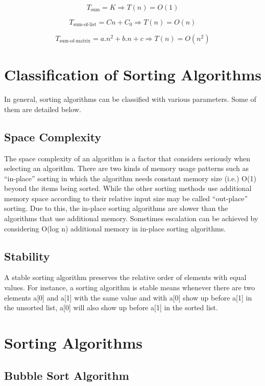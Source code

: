 \documentclass{article}
\begin{document}
\[
T_{\text{{sum}}} = K \Rightarrow T(n) = O(1)
\]

\[
T_{\text{{sum-of-list}}} = Cn + C_0 \Rightarrow T(n) = O(n)
\]

\[
T_{\text{{sum-of-matrix}}} = a.n^2 + b.n + c \Rightarrow T(n) = O(n^2)
\]



\section{Classification of Sorting Algorithms}
In general, sorting algorithms can be classified with various parameters. Some of
them are detailed below.\cite{karunanithi2014survey}

\subsection{Space Complexity}

The space complexity of an algorithm is a factor that considers seriously when
selecting an algorithm. There are two kinds of memory usage patterns such as “in-place” sorting in which the algorithm needs constant memory size (i.e.) O(1) beyond
the items being sorted. While the other sorting methods use additional memory
space according to their relative input size may be called “out-place” sorting. Due
to this, the in-place sorting algorithms are slower than the algorithms that use
additional memory. Sometimes escalation can be achieved by considering O(log n)
additional memory in in-place sorting algorithms.\cite{karunanithi2014survey}

\subsection{Stability}

A stable sorting algorithm preserves the relative order of elements with equal values.
For instance, a sorting algorithm is stable means whenever there are two elements
a[0] and a[1] with the same value and with a[0] show up before a[1] in the unsorted
list, a[0] will also show up before a[1] in the sorted list.\cite{karunanithi2014survey}
\newpage
\section{Sorting Algorithms}

\subsection{Bubble Sort Algorithm}
\end{document}

